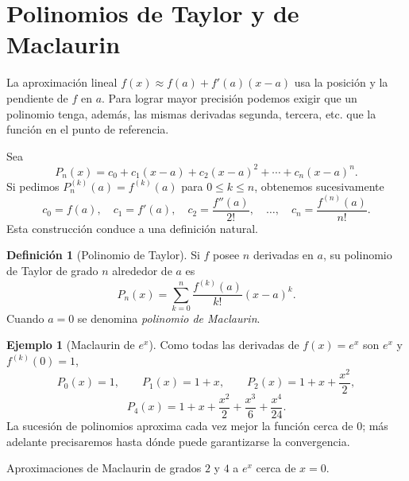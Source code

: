 \documentclass[12pt]{article}
\theoremstyle{definition}
\newtheorem{definicion}[teorema]{Definición}
\newtheorem{ejemplo}[teorema]{Ejemplo}
\theoremstyle{remark}
\begin{document}
\section{Polinomios de Taylor y de Maclaurin}
La aproximación lineal $f(x)\approx f(a)+f'(a)(x-a)$ usa la posición y la pendiente de $f$ en $a$. Para lograr mayor precisión podemos exigir que un polinomio tenga, además, las mismas derivadas segunda, tercera, etc. que la función en el punto de referencia.

Sea
\[P_n(x)=c_0+c_1(x-a)+c_2(x-a)^2+\cdots+c_n(x-a)^n.\]
Si pedimos $P_n^{(k)}(a)=f^{(k)}(a)$ para $0\le k\le n$, obtenemos sucesivamente
\[c_0=f(a),\quad c_1=f'(a),\quad c_2=\frac{f''(a)}{2!},\quad\ldots,\quad c_n=\frac{f^{(n)}(a)}{n!}.\]
Esta construcción conduce a una definición natural.
\begin{definicion}[Polinomio de Taylor]
Si $f$ posee $n$ derivadas en $a$, su polinomio de Taylor de grado $n$ alrededor de $a$ es
\[\boxed{P_n(x)=\sum_{k=0}^n\frac{f^{(k)}(a)}{k!}(x-a)^k.}\]
Cuando $a=0$ se denomina \emph{polinomio de Maclaurin}.
\end{definicion}
\begin{ejemplo}[Maclaurin de $e^x$]
Como todas las derivadas de $f(x)=e^x$ son $e^x$ y $f^{(k)}(0)=1$,
\[P_0(x)=1,\qquad P_1(x)=1+x,\qquad
P_2(x)=1+x+\frac{x^2}{2},\]
\[\boxed{P_4(x)=1+x+\frac{x^2}{2}+\frac{x^3}{6}+\frac{x^4}{24}}.\]
La sucesión de polinomios aproxima cada vez mejor la función cerca de $0$; más adelante precisaremos hasta dónde puede garantizarse la convergencia.
\end{ejemplo}
\begin{center}

{\small Aproximaciones de Maclaurin de grados $2$ y $4$ a $e^x$ cerca de $x=0$.}
\end{center}
\end{document}
